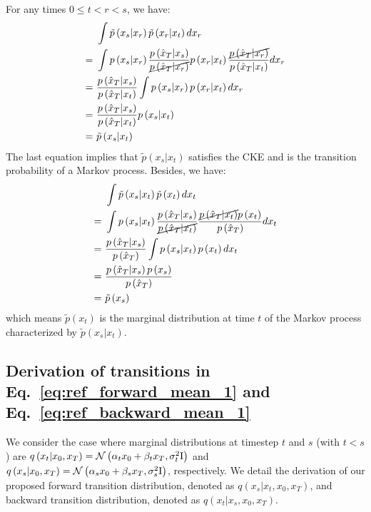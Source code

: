 For any times $0\leq t<r<s$, we have:
\begin{align}
 & \int\tilde{p}\left(x_{s}|x_{r}\right)\tilde{p}\left(x_{r}|x_{t}\right)dx_{r}\nonumber \\
=\  & \int p\left(x_{s}|x_{r}\right)\frac{p\left(\hat{x}_{T}|x_{s}\right)}{\cancel{p\left(\hat{x}_{T}|x_{r}\right)}}p\left(x_{r}|x_{t}\right)\frac{\cancel{p\left(\hat{x}_{T}|x_{r}\right)}}{p\left(\hat{x}_{T}|x_{t}\right)}dx_{r}\\
=\  & \frac{p\left(\hat{x}_{T}|x_{s}\right)}{p\left(\hat{x}_{T}|x_{t}\right)}\int p\left(x_{s}|x_{r}\right)p\left(x_{r}|x_{t}\right)dx_{r}\\
=\  & \frac{p\left(\hat{x}_{T}|x_{s}\right)}{p\left(\hat{x}_{T}|x_{t}\right)}p\left(x_{s}|x_{t}\right)\\
=\  & \tilde{p}\left(x_{s}|x_{t}\right)
\end{align}
The last equation implies that $\tilde{p}\left(x_{s}|x_{t}\right)$
satisfies the CKE and is the transition probability of a Markov process.
Besides, we have:
\begin{align}
 & \int\tilde{p}\left(x_{s}|x_{t}\right)\tilde{p}\left(x_{t}\right)dx_{t}\nonumber \\
=\  & \int p\left(x_{s}|x_{t}\right)\frac{p\left(\hat{x}_{T}|x_{s}\right)}{\cancel{p\left(\hat{x}_{T}|x_{t}\right)}}\frac{\cancel{p\left(\hat{x}_{T}|x_{t}\right)}p\left(x_{t}\right)}{p\left(\hat{x}_{T}\right)}dx_{t}\\
=\  & \frac{p\left(\hat{x}_{T}|x_{s}\right)}{p\left(\hat{x}_{T}\right)}\int p\left(x_{s}|x_{t}\right)p\left(x_{t}\right)dx_{t}\\
=\  & \frac{p\left(\hat{x}_{T}|x_{s}\right)p\left(x_{s}\right)}{p\left(\hat{x}_{T}\right)}\\
=\  & \tilde{p}\left(x_{s}\right)
\end{align}
which means $\tilde{p}\left(x_{t}\right)$ is the marginal distribution
at time $t$ of the Markov process characterized by $\tilde{p}\left(x_{s}|x_{t}\right)$.

\subsection{Derivation of transitions in Eq.~\ref{eq:ref_forward_mean_1} and
Eq.~\ref{eq:ref_backward_mean_1}}

We consider the case where marginal distributions at timestep $t$
and $s$ (with $t<s$) are $q\left(x_{t}|x_{0},x_{T}\right)=\mathcal{N}\left(\alpha_{t}x_{0}+\beta_{t}x_{T},\sigma_{t}^{2}\mathrm{I}\right)$
and $q\left(x_{s}|x_{0},x_{T}\right)=\mathcal{N}\left(\alpha_{s}x_{0}+\beta_{s}x_{T},\sigma_{s}^{2}\mathrm{I}\right)$,
respectively. We detail the derivation of our proposed forward transition
distribution, denoted as $q\left(x_{s}|x_{t},x_{0},x_{T}\right)$,
and backward transition distribution, denoted as $q\left(x_{t}|x_{s},x_{0},x_{T}\right)$.

